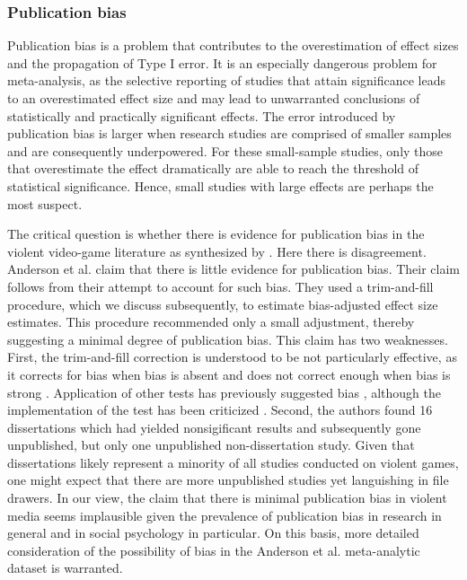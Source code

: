 \documentclass[man]{apa6}
\begin{document}
\subsubsection{Publication bias}
Publication bias is a problem that contributes to the overestimation of effect sizes and the propagation of Type I error. It is an especially dangerous problem for meta-analysis, as the selective reporting of studies that attain significance leads to an overestimated effect size and may lead to unwarranted conclusions of statistically and practically significant effects. The error introduced by publication bias is larger when research studies are comprised of smaller samples and are consequently underpowered.  For these small-sample studies, only those that overestimate the effect dramatically are able to reach the threshold of statistical significance. Hence, small studies with large effects are perhaps the most suspect.  

The critical question is whether there is evidence for publication bias in the violent video-game literature as synthesized by \citet{Anderson:etal:2010}.  Here there is disagreement.  Anderson et al. claim that there is little evidence for publication bias.  Their claim follows from their attempt to account for such bias.  They used a  trim-and-fill procedure, which we discuss subsequently, to estimate bias-adjusted effect size estimates. This procedure recommended only a small adjustment, thereby suggesting a minimal degree of publication bias. This claim has two weaknesses.  First, the trim-and-fill correction is understood to be not particularly effective, as it corrects for bias when bias is absent and does not correct enough when bias is strong \citep{Simonsohn:etal:2014b}. Application of other tests has previously suggested bias \citet{Ferguson:2007}, although the implementation of the test has been criticized \citep[see][]{Anderson:etal:2010}. Second, the authors found 16 dissertations which had yielded nonsigificant results and subsequently gone unpublished, but only one unpublished non-dissertation study. Given that dissertations likely represent a minority of all studies conducted on violent games, one might expect that there are more unpublished studies yet languishing in file drawers. In our view, the claim that there is minimal publication bias in violent media seems implausible given the prevalence of publication bias in research in general and in social psychology in particular.  On this basis, more detailed consideration of the possibility of bias in the Anderson et al. meta-analytic dataset is warranted.
\end{document}
